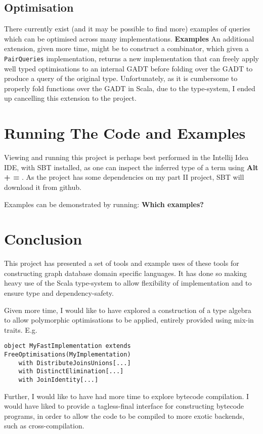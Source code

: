 \documentclass{report}
\newcommand \2[0]{\textbf{2}}
\newcommand \3[0]{\textbf{3}}
\newcommand{\todo}[1]{\textbf{#1}}
\begin{document}
\section{Optimisation}
There currently exist (and it may be possible to find more) examples of queries which can be optimised across many implementations. \todo{Examples} An additional extension, given more time, might be to construct a combinator, which given a \texttt{PairQueries} implementation, returns a new implementation that can freely apply well typed optimisations to an internal GADT before folding over the GADT to produce a query of the original type. Unfortunately, as it is cumbersome to properly fold functions over the GADT in Scala, due to the type-system, I ended up cancelling this extension to the project.

\chapter{Running The Code and Examples}
Viewing and running this project is perhaps best performed in the Intellij Idea IDE, with SBT installed, as one can inspect the inferred type of a term using \todo{Alt + = }.
As the project has some dependencies on my part II project, SBT will download it from github.

Examples can be demonstrated by running: \todo{Which examples?}


\chapter{Conclusion}
This project has presented a set of tools and example uses of these tools for constructing graph database domain specific languages. It has done so making heavy use of the Scala type-system to allow flexibility of implementation and to ensure type and dependency-safety.

Given more time, I would like to have explored a construction of a type algebra to allow polymorphic optimisations to be applied, entirely provided using mix-in traits. E.g.

\begin{verbatim}
object MyFastImplementation extends FreeOptimisations(MyImplementation) 
    with DistributeJoinsUnions[...]
    with DistinctElimination[...]
    with JoinIdentity[...]
\end{verbatim}

Further, I would like to have had more time to explore bytecode compilation. I would have liked to provide a tagless-final interface for constructing bytecode programs, in order to allow the code to be compiled to more exotic backends, such as cross-compilation.
    
\end{document}
